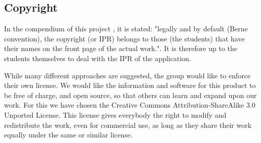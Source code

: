 \subsection{Copyright}

In the compendium of this project \cite[Section~3.9]{compendium}, it is stated: "legally and by default (Berne convention), the copyright (or IPR) belongs to those 
(the students) that have their names on the front page of the actual work.".\newline
It is therefore up to the students themselves to deal with the IPR of the application.

While many different approaches are suggested, the group would like to enforce their own license. We would like the information and software for this product to be free of charge, and open source, so that others can learn and expand upon our work. For this we have chosen the Creative Commons Attribution-ShareAlike 3.0 Unported License\cite{creativecommons}. This license gives everybody the right to modify and redistribute the work, even for commercial use, as long as they share their work equally under the same or similar license. 
